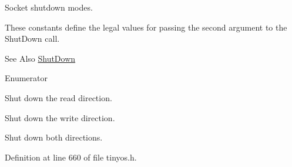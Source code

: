 Socket shutdown modes. 

These constants define the legal values for passing the second argument to the {\ttfamily Shut\-Down} call.

\begin{DoxySeeAlso}{See Also}
\hyperlink{group__syscalls_ga61d49d63d8c0f9fc0917cc1bda6fdfcb}{Shut\-Down} 
\end{DoxySeeAlso}
\begin{Desc}
\item[Enumerator]\par
\begin{description}
\item[{\em 
\hypertarget{group__syscalls_gga9eb10a0a72ca3149140272e9344a272bacbd27e0b4e3d4a02b0d833f919887d2d}{S\-H\-U\-T\-D\-O\-W\-N\-\_\-\-R\-E\-A\-D}\label{group__syscalls_gga9eb10a0a72ca3149140272e9344a272bacbd27e0b4e3d4a02b0d833f919887d2d}
}]Shut down the read direction. \item[{\em 
\hypertarget{group__syscalls_gga9eb10a0a72ca3149140272e9344a272ba9a7920b6a1eb57633bb981aa60edbe24}{S\-H\-U\-T\-D\-O\-W\-N\-\_\-\-W\-R\-I\-T\-E}\label{group__syscalls_gga9eb10a0a72ca3149140272e9344a272ba9a7920b6a1eb57633bb981aa60edbe24}
}]Shut down the write direction. \item[{\em 
\hypertarget{group__syscalls_gga9eb10a0a72ca3149140272e9344a272bab67e72e17566af8eb432d0f3eba6d44d}{S\-H\-U\-T\-D\-O\-W\-N\-\_\-\-B\-O\-T\-H}\label{group__syscalls_gga9eb10a0a72ca3149140272e9344a272bab67e72e17566af8eb432d0f3eba6d44d}
}]Shut down both directions. \end{description}
\end{Desc}


Definition at line 660 of file tinyos.\-h.



